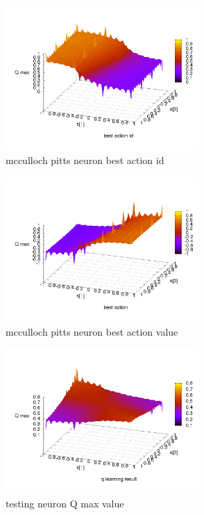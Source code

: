 \documentclass[10pt,a5paper]{article}
\begin{document}
\begin{figure}[!ht]
\centering
\includegraphics[width=2.9in]{q_learning_test/experiment_03/mcculloch_pitts_neuron/q_action_id.png}
\caption{mcculloch pitts neuron best action id}
\label{mcculloch pitts neuron best action id}
\end{figure}

\begin{figure}[!ht]
\centering
\includegraphics[width=2.9in]{q_learning_test/experiment_03/mcculloch_pitts_neuron/q_action.png}
\caption{mcculloch pitts neuron best action value}
\label{mcculloch pitts neuron best action value}
\end{figure}

\begin{figure}[!ht]
\centering
\includegraphics[width=2.9in]{q_learning_test/experiment_03/testing_neuron/q_map.png}
\caption{testing neuron Q max value}
\label{testing neuron Q max value}
\end{figure}
\end{document}
